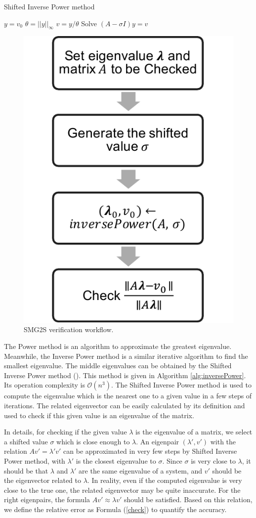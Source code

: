 \begin{algorithm}[t]{}
	\caption{Shifted Inverse Power method}   
	\label{alg:inversePower}   
	\begin{algorithmic}[1]
		\State $y=v_0$
		\State $\theta=||y||_\infty$
		\State $v=y/\theta$
		\State Solve $(A-\sigma I)y=v$
		\EndFor 
		\EndFunction
	\end{algorithmic}  
\end{algorithm}

\begin{figure}[t]
	\centering
	\includegraphics[width=0.4\linewidth]{fig/smg2s-check.pdf}
	\caption{SMG2S verification workflow.}
	\label{smg2s-check}
\end{figure}

The Power method is an algorithm to approximate the greatest eigenvalue. Meanwhile, the Inverse Power method is a similar iterative algorithm to find the smallest eigenvalue. The middle eigenvalues can be obtained by the Shifted Inverse Power method (\cite{hernandez2005single}).  This method is given in Algorithm \ref{alg:inversePower}. Its operation complexity is $\mathcal{O}(n^3)$. The Shifted Inverse Power method is used to compute the eigenvalue which is the nearest one to a given value in a few steps of iterations. The related eigenvector can be easily calculated by its definition and used to check if this given value is an eigenvalue of the matrix.

In details, for checking if the given value $\lambda$ is the eigenvalue of a matrix, we select a shifted value $\sigma$ which is close enough to $\lambda$. An eigenpair $(\lambda', v')$ with the relation $Av'=\lambda' v'$ can be approximated in very few steps by Shifted Inverse Power method, with $\lambda'$ is the closest eigenvalue to $\sigma$. Since $\sigma$ is very close to $\lambda$, it should be that $\lambda$ and $\lambda'$ are the same eigenvalue of a system, and $v'$ should be the eigenvector related to $\lambda$. In reality, even if the computed eigenvalue is very close to the true one, the related eigenvector may be quite inaccurate. For the right eigenpairs, the formula $Av'\approx\lambda v'$ should be satisfied. Based on this relation, we define the relative error as Formula (\ref{check}) to quantify the accuracy. 


